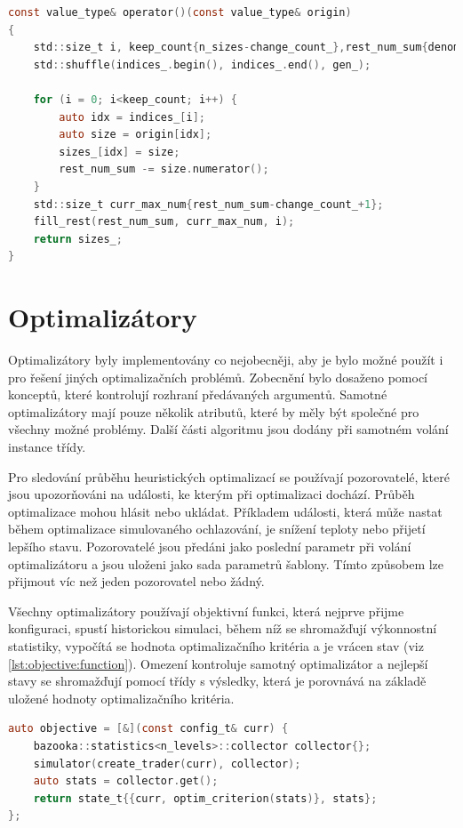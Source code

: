 \begin{lstlisting}[caption={~Metody pro náhodné generování velikostí nákupu z počátku},label={lst:random:sizes:generator:origin},captionpos=t,abovecaptionskip=-\medskipamount,belowcaptionskip=\medskipamount,language=C]
const value_type& operator()(const value_type& origin)
{
    std::size_t i, keep_count{n_sizes-change_count_},rest_num_sum{denom_};
    std::shuffle(indices_.begin(), indices_.end(), gen_);

    for (i = 0; i<keep_count; i++) {
        auto idx = indices_[i];
        auto size = origin[idx];
        sizes_[idx] = size;
        rest_num_sum -= size.numerator();
    }
    std::size_t curr_max_num{rest_num_sum-change_count_+1};
    fill_rest(rest_num_sum, curr_max_num, i);
    return sizes_;
}
\end{lstlisting}

\chapter{Optimalizátory}
Optimalizátory byly implementovány co nejobecněji, aby je bylo možné použít i pro řešení jiných optimalizačních problémů.
Zobecnění bylo dosaženo pomocí konceptů, které kontrolují rozhraní předávaných argumentů.
Samotné optimalizátory mají pouze několik atributů, které by měly být společné pro všechny možné problémy.
Další části algoritmu jsou dodány při samotném volání instance třídy.

Pro sledování průběhu heuristických optimalizací se používají pozorovatelé, které jsou upozorňováni na události, ke kterým při optimalizaci dochází.
Průběh optimalizace mohou hlásit nebo ukládat.
Příkladem události, která může nastat během optimalizace simulovaného ochlazování, je snížení teploty nebo přijetí lepšího stavu.
Pozorovatelé jsou předáni jako poslední parametr při volání optimalizátoru a jsou uloženi jako sada parametrů šablony.
Tímto způsobem lze přijmout víc než jeden pozorovatel nebo žádný.

Všechny optimalizátory používají objektivní funkci, která nejprve přijme konfiguraci, spustí historickou simulaci, během níž se shromažďují výkonnostní statistiky, vypočítá se hodnota optimalizačního kritéria a je vrácen stav (viz \ref{lst:objective:function}).
Omezení kontroluje samotný optimalizátor a nejlepší stavy se shromažďují pomocí třídy s výsledky, která je porovnává na základě uložené hodnoty optimalizačního kritéria.

\begin{lstlisting}[caption={~Implementace objektivní funkce},label={lst:objective:function},captionpos=t,abovecaptionskip=-\medskipamount,belowcaptionskip=\medskipamount,language=C]
auto objective = [&](const config_t& curr) {
    bazooka::statistics<n_levels>::collector collector{};
    simulator(create_trader(curr), collector);
    auto stats = collector.get();
    return state_t{{curr, optim_criterion(stats)}, stats};
};
\end{lstlisting}

